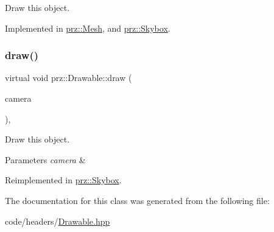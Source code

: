Draw this object. 



Implemented in \mbox{\hyperlink{classprz_1_1_mesh_aed5a3cd6605bc59e29d6957a8f1a1131}{prz\+::\+Mesh}}, and \mbox{\hyperlink{classprz_1_1_skybox_aec1e6ca523b459acf02df4800e27de23}{prz\+::\+Skybox}}.

\mbox{\label{classprz_1_1_drawable_ab82bbd8a27416a49efcef7fa11b59b89}} 
\subsubsection{\texorpdfstring{draw()}{draw()}\hspace{0.1cm}{\footnotesize\ttfamily [2/2]}}
{\footnotesize\ttfamily virtual void prz\+::\+Drawable\+::draw (\begin{DoxyParamCaption}\item[{P\+S\+Ptr$<$ \mbox{\hyperlink{classprz_1_1_camera}{Camera}} $>$}]{camera }\end{DoxyParamCaption})\hspace{0.3cm}{\ttfamily [inline]}, {\ttfamily [virtual]}}



Draw this object. 


\begin{DoxyParams}{Parameters}
{\em camera} & \\
\hline
\end{DoxyParams}


Reimplemented in \mbox{\hyperlink{classprz_1_1_skybox_a8a55c1baca43d28ec7d13c68828b7bb8}{prz\+::\+Skybox}}.



The documentation for this class was generated from the following file\+:\begin{DoxyCompactItemize}
\item 
code/headers/\mbox{\hyperlink{_drawable_8hpp}{Drawable.\+hpp}}\end{DoxyCompactItemize}
